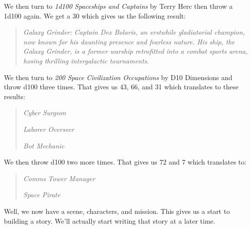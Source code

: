 We then turn to \emph{1d100 Spaceships and Captains} by Terry Herc then
throw a 1d100 again. We get a 30 which gives us the following result:

\begin{quote}
\emph{Galaxy Grinder: Captain Dex Bolaris, an erstwhile gladiatorial
champion, now known for his daunting presence and fearless nature. His
ship, the Galaxy Grinder, is a former warship retrofitted into a combat
sports arena, hosing thrilling intergalactic tournaments.}
\end{quote}

We then turn to \emph{200 Space Civilization Occupations} by D10
Dimensions and throw d100 three times. That gives us 43, 66, and 31
which translates to these results:

\begin{quote}
\emph{Cyber Surgeon}

\emph{Laborer Overseer}

\emph{Bot Mechanic}
\end{quote}

We then throw d100 two more times. That gives us 72 and 7 which
translates to:

\begin{quote}
\emph{Comms Tower Manager}

\emph{Space Pirate}
\end{quote}

Well, we now have a scene, characters, and mission. This gives us a
start to building a story. We'll actually start writing that story at a
later time.
